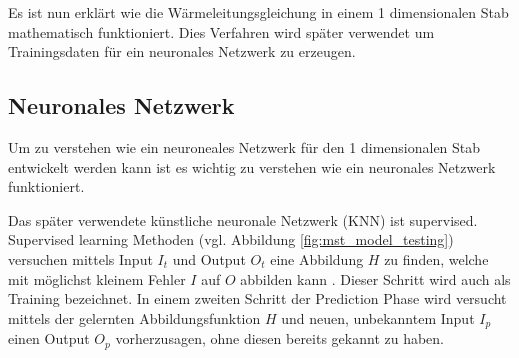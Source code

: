 Es ist nun erklärt wie die Wärmeleitungsgleichung in einem 1 dimensionalen Stab mathematisch funktioniert. Dies Verfahren wird später verwendet um Trainingsdaten für ein neuronales Netzwerk zu erzeugen.


\subsection{Neuronales Netzwerk}

Um zu verstehen wie ein neuroneales Netzwerk für den 1 dimensionalen Stab entwickelt werden kann ist es wichtig zu verstehen wie ein neuronales Netzwerk funktioniert.

Das später verwendete künstliche neuronale Netzwerk (KNN) ist supervised. Supervised learning Methoden (vgl. Abbildung \ref{fig:mst_model_testing}) versuchen mittels Input $I_{t}$ und Output $O_{t}$ eine Abbildung $H$ zu finden, welche mit möglichst kleinem Fehler $I$ auf $O$ abbilden kann \cite{MIT:2015}. Dieser Schritt wird auch als Training bezeichnet. In einem zweiten Schritt der Prediction Phase wird versucht mittels der gelernten Abbildungsfunktion $H$ und neuen, unbekanntem Input $I_{p}$ einen Output $O_{p}$ vorherzusagen, ohne diesen bereits gekannt zu haben.

